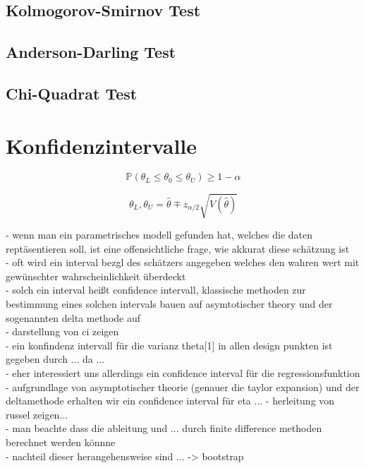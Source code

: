 \subsection{Kolmogorov-Smirnov Test}
\subsection{Anderson-Darling Test}
\subsection{Chi-Quadrat Test}


\section{Konfidenzintervalle}
\begin{equation}
\mathbb{P} \left( \theta_L \le \theta_0 \le \theta_U \right) \geq 1-\alpha
\end{equation}

\begin{equation}
\theta_L, \theta_U = \hat\theta \mp z_{\alpha/2}
\sqrt{
  V(\hat\theta)
}
\end{equation}

- wenn man ein parametrisches modell gefunden hat, welches die daten reptäsentieren soll, ist eine offensichtliche frage, wie akkurat diese schätzung ist\\
- oft wird ein interval bezgl des schätzers angegeben welches den wahren wert mit gewünschter wahrscheinlichkeit überdeckt\\
- solch ein interval heißt confidence intervall, klassische methoden zur bestimmung eines solchen intervals bauen auf asymtotischer theory und der sogenannten delta methode auf\\
- darstellung von ci zeigen\\
- ein konfindenz intervall für die varianz theta[1] in allen design punkten ist gegeben durch ... da ...\\
- eher interessiert uns allerdings ein confidence interval für die regressionsfunktion \\
- aufgrundlage von asymptotischer theorie (genauer die taylor expansion) und der deltamethode erhalten wir ein confidence interval für eta ...
- herleitung von russel zeigen...\\
- man beachte dass die ableitung und ... durch finite difference methoden berechnet werden könnne\\
- nachteil dieser herangehensweise sind ... -> bootstrap\\

